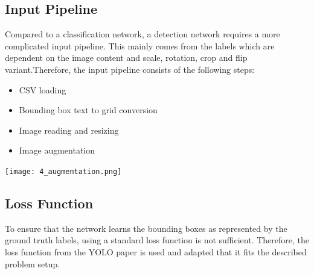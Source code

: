 \documentclass[landscape,a2,final,12pt]{issposter}
\begin{document}
\begin{multicols}{3}
    \begin{samepage}
    \section{Input Pipeline}
        
            \begin{small}Compared to a classification network, a detection network requires a more complicated input pipeline. This mainly comes from the 
            labels which are dependent on the image content and scale, rotation, crop and flip variant.Therefore, the input pipeline consists of the following steps:
            \begin{itemize}
                \item CSV loading
                \item Bounding box text to grid conversion
                \item Image reading and resizing
                \item Image augmentation
            \end{itemize}
            \begin{minipage}[t]{0.3\textwidth}
                \begin{center}
                    \texttt{[image: 4\_augmentation.png]}
                \end{center}
            \end{minipage}
            \end{small}
            \vspace*{5cm}
    \end{samepage}
    \columnbreak
    \begin{samepage}
    \section{Loss Function}
            \begin{small} To ensure that the network learns the bounding boxes as represented by the ground truth labels, 
            using a standard loss function is not sufficient. Therefore, the loss function from the YOLO paper is used and adapted 
            that it fits the described problem setup.
            

\end{small}
\end{samepage}
\end{multicols}
\end{document}
